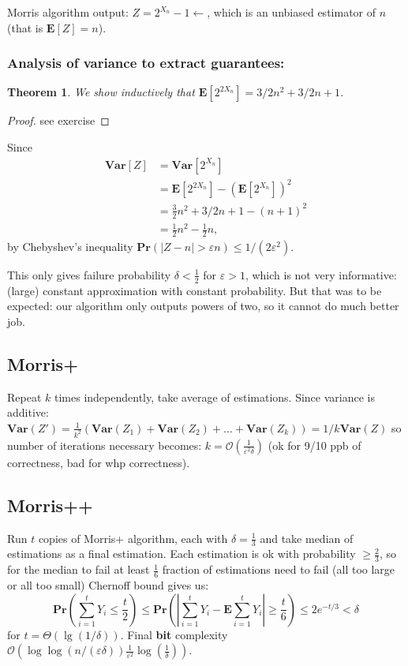 \documentclass[11pt]{article}
\newcommand{\Ppb}{\mathbf{Pr}}
\newcommand{\Es}{\mathbf{E}}
\newcommand{\bigo}{\mathcal{O}}
\newcommand{\Var}{\mathbf{Var}}
\newtheorem{theorem}{Theorem}
\begin{document}
Morris algorithm output: $Z = 2^{X_{n}}-1   \leftarrow$, which is an unbiased estimator of $n$ (that is $\Es[Z] = n$).

\subsubsection{Analysis of variance to extract guarantees:}

\begin{theorem}
We show inductively that $\Es[2^{2X_n}] = 3/2 n^2 + 3/2 n + 1$.
\end{theorem}
\begin{proof}
see exercise
\end{proof}

Since
\begin{align*}
    \Var[Z] &= \Var[2^{X_n}] \\
    &= \Es[2^{2 X_n} ] - (\Es[2^{X_n}])^2 \\
    &= \frac{3}{2} n^2 + 3/2 n + 1 - (n+1)^2 \\
    &= \frac{1}{2} n^2 - \frac{1}{2}n,
\end{align*}
by Chebyshev’s inequality $\Ppb( |Z-n| > \varepsilon n) \leq 1/(2 \varepsilon^2)$.

This only gives failure probability $\delta < \frac{1}{2}$ for $\varepsilon > 1$, which is not very informative: (large) constant approximation with constant probability. But that was to be expected: our algorithm only outputs powers of two, so it cannot do much better job.
\subsection{Morris+}
Repeat $k$ times independently, take average of estimations.
Since variance is additive: $\Var(Z') = \frac{1}{k^2}  (\Var(Z_1) + \Var(Z_2) + \dots + \Var(Z_k)) = 1/k  \Var(Z)$ so number of iterations necessary becomes: $k = \bigo(\frac{1}{\varepsilon^2 \delta})$
(ok for 9/10 ppb of correctness, bad for whp correctness).

\subsection{Morris++}
Run $t$ copies of Morris+ algorithm, each with $\delta = \frac{1}{3}$ and take median of estimations as a final estimation. Each estimation is ok with probability $\geq \frac{2}{3}$, so for the median to fail at least $\frac{1}{6}$ fraction of estimations need to fail (all too large or all too small)
Chernoff bound gives us:
\begin{equation}
\Ppb \left(\sum_{i=1}^{t} Y_{i} \leq \frac{t}{2}\right) \leq \Ppb \left(\left|\sum_{i=1}^{t} Y_{i}-\Es \sum_{i=1}^{t} Y_{i}\right| \geq \frac{t}{6}\right) \leq 2 e^{-t / 3}<\delta
\end{equation}
for $t = \Theta(\lg (1 / \delta))$.
Final \textbf{bit} complexity $\bigo(\log \log (n/(\varepsilon \delta)) \frac{1}{\varepsilon^2} \log(\frac{1}{\delta}))$.
\end{document}
